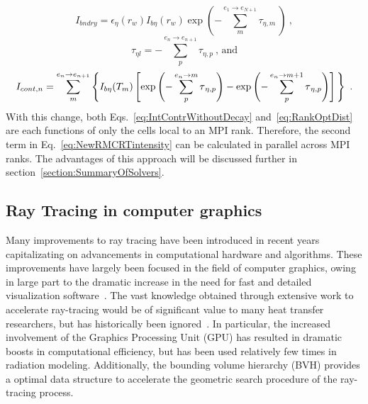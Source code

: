 \begin{equation}
    I_{bndry}=\epsilon{}_\eta{}(r_w)I_{b\eta{}}(r_w)\exp{\left(-\sum_{m}^{e_1\rightarrow{}e_{N+1}}\tau{}_{\eta{},m}~\right)}~,
    \label{eq:Ibndry}
\end{equation}
\begin{equation}
    \tau{}_{\eta{}l}=-\sum_{p}^{e_n\rightarrow{}e_{n+1}}\tau{}_{\eta{},p}~\text{, and}
    \label{eq:RankOptDist}
\end{equation}
\begin{equation}
    I_{cont,n}=\sum_{m}^{e_n\rightarrow{}e_{n+1}}\left\{ I_{b\eta}(T_m)\left[ \exp{\left(-\sum_{p}^{e_n\rightarrow{}m}\tau{}_{\eta,p}\right)}
    -\exp{\left(-\sum_{p}^{e_n\rightarrow{}m+1}\tau{}_{\eta{},p}\right)} \vphantom{\frac12}\right] \vphantom{\frac12}\right\}~.
    \label{eq:IntContrWithoutDecay}
\end{equation}
With this change, both Eqs.~\ref{eq:IntContrWithoutDecay} and~\ref{eq:RankOptDist} are each functions of only the cells local to an MPI rank. Therefore, the second term in Eq.~\ref{eq:NewRMCRTintensity} can be calculated in parallel across MPI ranks. The advantages of this approach will be discussed further in section~\ref{section:SummaryOfSolvers}.


\subsection{Ray Tracing in computer graphics}\label{section:ComputerGraphicsTracing}
Many improvements to ray tracing have been introduced in recent years capitalizating on advancements in computational hardware and algorithms.
These improvements have largely been focused in the field of computer graphics, owing in large part to the dramatic increase in the need for fast and detailed visualization software~\cite{Gupta2020CUDAComputing}. 
The vast knowledge obtained through extensive work to accelerate ray-tracing would be of significant value to many heat transfer researchers, but has historically been ignored~\cite{Howell2021TheTransfer}. 
In particular, the increased involvement of the Graphics Processing Unit (GPU) has resulted in dramatic boosts in computational efficiency, but has been used relatively few times in radiation modeling.
Additionally, the bounding volume hierarchy (BVH) provides a optimal data structure to accelerate the geometric search procedure of the ray-tracing process.

